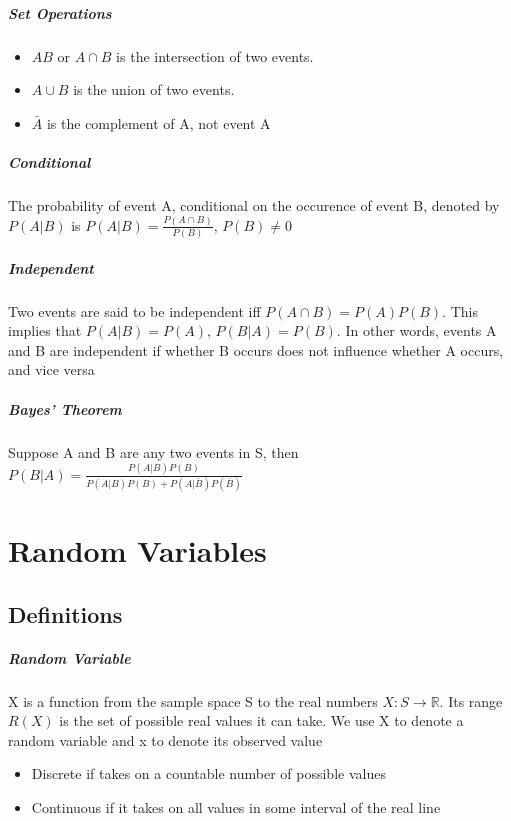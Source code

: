 \documentclass[12pt]{report}
\begin{document}
    \paragraph{Set Operations}
    \begin{itemize}
      \item $AB$ or $A\cap B$ is the intersection of two
      events.
      \item$A \cup B$ is the union of two events.
      \item $\bar{A}$ is the complement of A, not event A
    \end{itemize}

    \paragraph{Conditional} The probability of event A, conditional on the
    occurence of event B, denoted by $P(A|B)$ is $P(A|B) = \frac{P(A \cap
    B)}{P(B)}$, $P(B) \neq 0$

    \paragraph{Independent} Two events are said to be independent iff $P(A \cap
    B) = P(A)P(B)$. This implies that $P(A|B) = P(A)$, $P(B|A) = P(B)$. In
    other words, events A and B are independent if whether B occurs does not
    influence whether A occurs, and vice versa

    \paragraph{Bayes' Theorem} Suppose A and B are any two events in S, then
    $P(B|A) = \frac{P(A|B)P(B)}{P(A|B)P(B) + P(A|\bar{B})P(\bar{B})}$

\chapter{Random Variables}
  \section{Definitions}
    \paragraph{Random Variable} X is a function from the sample space S to the
    real numbers $X : S \rightarrow \mathbb{R}$. Its range $R(X)$ is the set of
    possible real values it can take. We use X to denote a random variable and
    x to denote its observed value
    \begin{itemize}
      \item Discrete if takes on a countable number of possible values
      \item Continuous if it takes on all values in some interval of the real
      line
    \end{itemize}
\end{document}
